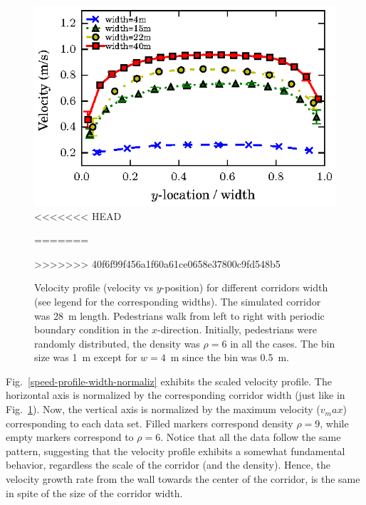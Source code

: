 \begin{figure}[htbp!]
\includegraphics[width=\columnwidth]
{plots/v(y)_multi_width.eps}
<<<<<<< HEAD
\caption{\label{speed-profile-multi_width} Velocity profile (velocity vs $y$-position) for different corridors width (see legend for the corresponding widths). The simulated corridor was 28~m length. Pedestrians walk from left to right with periodic boundary condition in the $x$-direction. Initially, pedestrians were randomly distributed, the density was $\rho = 6$ in all the cases (high density regime). The bin size was 1~m except for $w=4$~m since the bin was 0.5~m.}
=======
\caption{\label{speed-profile-multi_width} Velocity profile (velocity vs $y$-position) for different corridors width (see legend for the corresponding widths). The simulated corridor was 28~m length. Pedestrians walk from left to right with periodic boundary condition in the $x$-direction. Initially, pedestrians were randomly distributed, the density was $\rho = 6$ in all the cases. The bin size was 1~m except for $w=4$~m since the bin was 0.5~m. }
>>>>>>> 40f6f99f456a1f60a61ce0658e37800c9fd548b5
\end{figure}


Fig.~\ref{speed-profile-width-normaliz} exhibits the scaled velocity profile. The horizontal axis is normalized by the corresponding corridor width (just like in Fig.~\ref{speed-profile-multi_width}). Now, the vertical axis is normalized by the maximum velocity ($v_max$) corresponding to each data set. Filled markers correspond density $\rho=9$, while empty markers correspond to $\rho=6$. Notice that all the data follow the same  pattern, suggesting that the velocity profile exhibits a somewhat fundamental behavior, regardless the scale of the corridor (and the density). Hence, the velocity growth rate from the wall towards the center of the corridor, is the same in spite of the size of the corridor width. 


